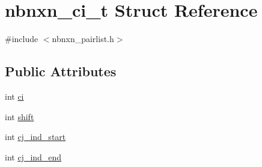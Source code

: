 \hypertarget{structnbnxn__ci__t}{\section{nbnxn\-\_\-ci\-\_\-t \-Struct \-Reference}
\label{structnbnxn__ci__t}
}


{\ttfamily \#include $<$nbnxn\-\_\-pairlist.\-h$>$}

\subsection*{\-Public \-Attributes}
\begin{DoxyCompactItemize}
\item 
int \hyperlink{structnbnxn__ci__t_a49335491df32fed25b76043fbfbd6845}{ci}
\item 
int \hyperlink{structnbnxn__ci__t_aff10c0c556095e1f0eb09b940c0a1886}{shift}
\item 
int \hyperlink{structnbnxn__ci__t_a7cce522fb52b4c60176f5aabd31af187}{cj\-\_\-ind\-\_\-start}
\item 
int \hyperlink{structnbnxn__ci__t_af23072e3b54ee14afa05fe5eec11f383}{cj\-\_\-ind\-\_\-end}
\end{DoxyCompactItemize}


